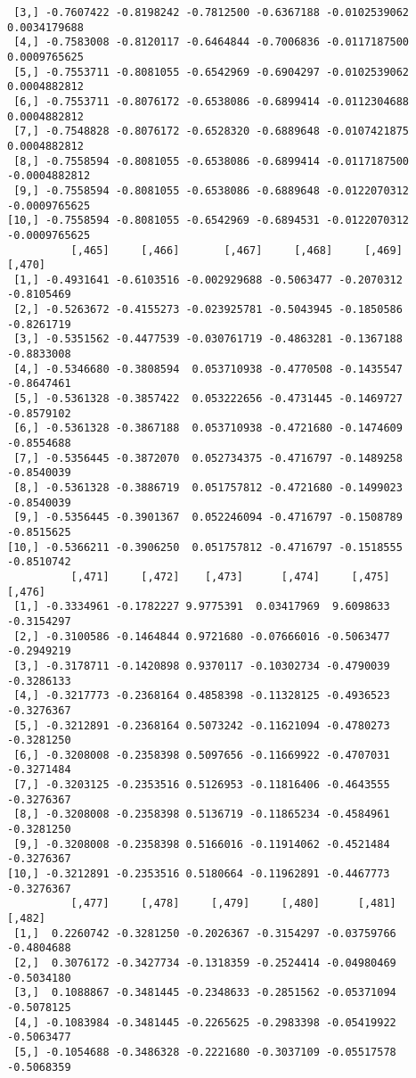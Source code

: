 \documentclass[
  letterpaper,
  DIV=11,
  numbers=noendperiod]{scrreprt}
\begin{document}
\begin{verbatim}
 [3,] -0.7607422 -0.8198242 -0.7812500 -0.6367188 -0.0102539062  0.0034179688
 [4,] -0.7583008 -0.8120117 -0.6464844 -0.7006836 -0.0117187500  0.0009765625
 [5,] -0.7553711 -0.8081055 -0.6542969 -0.6904297 -0.0102539062  0.0004882812
 [6,] -0.7553711 -0.8076172 -0.6538086 -0.6899414 -0.0112304688  0.0004882812
 [7,] -0.7548828 -0.8076172 -0.6528320 -0.6889648 -0.0107421875  0.0004882812
 [8,] -0.7558594 -0.8081055 -0.6538086 -0.6899414 -0.0117187500 -0.0004882812
 [9,] -0.7558594 -0.8081055 -0.6538086 -0.6889648 -0.0122070312 -0.0009765625
[10,] -0.7558594 -0.8081055 -0.6542969 -0.6894531 -0.0122070312 -0.0009765625
          [,465]     [,466]       [,467]     [,468]     [,469]     [,470]
 [1,] -0.4931641 -0.6103516 -0.002929688 -0.5063477 -0.2070312 -0.8105469
 [2,] -0.5263672 -0.4155273 -0.023925781 -0.5043945 -0.1850586 -0.8261719
 [3,] -0.5351562 -0.4477539 -0.030761719 -0.4863281 -0.1367188 -0.8833008
 [4,] -0.5346680 -0.3808594  0.053710938 -0.4770508 -0.1435547 -0.8647461
 [5,] -0.5361328 -0.3857422  0.053222656 -0.4731445 -0.1469727 -0.8579102
 [6,] -0.5361328 -0.3867188  0.053710938 -0.4721680 -0.1474609 -0.8554688
 [7,] -0.5356445 -0.3872070  0.052734375 -0.4716797 -0.1489258 -0.8540039
 [8,] -0.5361328 -0.3886719  0.051757812 -0.4721680 -0.1499023 -0.8540039
 [9,] -0.5356445 -0.3901367  0.052246094 -0.4716797 -0.1508789 -0.8515625
[10,] -0.5366211 -0.3906250  0.051757812 -0.4716797 -0.1518555 -0.8510742
          [,471]     [,472]    [,473]      [,474]     [,475]     [,476]
 [1,] -0.3334961 -0.1782227 9.9775391  0.03417969  9.6098633 -0.3154297
 [2,] -0.3100586 -0.1464844 0.9721680 -0.07666016 -0.5063477 -0.2949219
 [3,] -0.3178711 -0.1420898 0.9370117 -0.10302734 -0.4790039 -0.3286133
 [4,] -0.3217773 -0.2368164 0.4858398 -0.11328125 -0.4936523 -0.3276367
 [5,] -0.3212891 -0.2368164 0.5073242 -0.11621094 -0.4780273 -0.3281250
 [6,] -0.3208008 -0.2358398 0.5097656 -0.11669922 -0.4707031 -0.3271484
 [7,] -0.3203125 -0.2353516 0.5126953 -0.11816406 -0.4643555 -0.3276367
 [8,] -0.3208008 -0.2358398 0.5136719 -0.11865234 -0.4584961 -0.3281250
 [9,] -0.3208008 -0.2358398 0.5166016 -0.11914062 -0.4521484 -0.3276367
[10,] -0.3212891 -0.2353516 0.5180664 -0.11962891 -0.4467773 -0.3276367
          [,477]     [,478]     [,479]     [,480]      [,481]     [,482]
 [1,]  0.2260742 -0.3281250 -0.2026367 -0.3154297 -0.03759766 -0.4804688
 [2,]  0.3076172 -0.3427734 -0.1318359 -0.2524414 -0.04980469 -0.5034180
 [3,]  0.1088867 -0.3481445 -0.2348633 -0.2851562 -0.05371094 -0.5078125
 [4,] -0.1083984 -0.3481445 -0.2265625 -0.2983398 -0.05419922 -0.5063477
 [5,] -0.1054688 -0.3486328 -0.2221680 -0.3037109 -0.05517578 -0.5068359

\end{verbatim}
\end{document}
